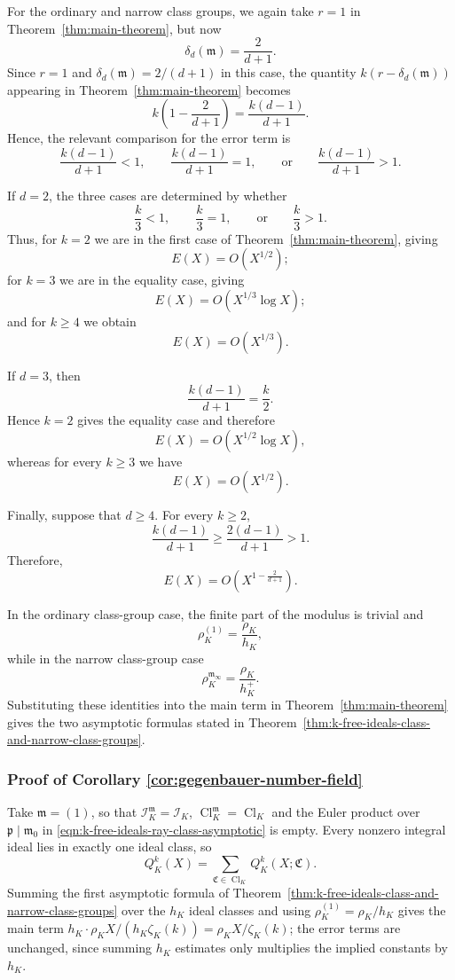 \documentclass[11pt, reqno]{amsart}
\numberwithin{equation}{section}
\newcommand{\Cl}{\operatorname{Cl}}
\theoremstyle{definition}
\begin{document}
For the ordinary and narrow class groups, we again take $r=1$ in
Theorem~\ref{thm:main-theorem}, but now
\[
\delta_d(\mathfrak{m})=\frac{2}{d+1}.
\]
Since $r=1$ and $\delta_d(\mathfrak{m})=2/(d+1)$ in this case, the quantity
$k(r-\delta_d(\mathfrak{m}))$ appearing in Theorem~\ref{thm:main-theorem}
becomes
\[
k\left(1-\frac{2}{d+1}\right)
=
\frac{k(d-1)}{d+1}.
\]
Hence, the relevant comparison for the error term is
\[
\frac{k(d-1)}{d+1}<1,\qquad
\frac{k(d-1)}{d+1}=1,\qquad\text{or}\qquad
\frac{k(d-1)}{d+1}>1.
\]

If $d=2$, the three cases are determined by whether
\[
\frac{k}{3}<1,\qquad
\frac{k}{3}=1,\qquad\text{or}\qquad
\frac{k}{3}>1.
\]
Thus, for $k=2$ we are in the first case of
Theorem~\ref{thm:main-theorem}, giving
\[
E(X)=O(X^{1/2});
\]
for $k=3$ we are in the equality case, giving
\[
E(X)=O(X^{1/3}\log X);
\]
and for $k\geq4$ we obtain
\[
E(X)=O(X^{1/3}).
\]

If $d=3$, then
\[
\frac{k(d-1)}{d+1}=\frac{k}{2}.
\]
Hence $k=2$ gives the equality case and therefore
\[
E(X)=O(X^{1/2}\log X),
\]
whereas for every $k\geq3$ we have
\[
E(X)=O(X^{1/2}).
\]

Finally, suppose that $d\geq4$. For every $k\geq2$,
\[
\frac{k(d-1)}{d+1}
\geq
\frac{2(d-1)}{d+1}
>1.
\]
Therefore,
\[
E(X)
=
O\left(X^{1-\frac{2}{d+1}}\right).
\]

In the ordinary class-group case, the finite part of the modulus is
trivial and
\[
\rho_K^{(1)}=\frac{\rho_K}{h_K},
\]
while in the narrow class-group case
\[
\rho_K^{\mathfrak{m}_{\infty}}
=
\frac{\rho_K}{h_K^+}.
\]
Substituting these identities into the main term in
Theorem~\ref{thm:main-theorem} gives the two asymptotic formulas stated
in Theorem~\ref{thm:k-free-ideals-class-and-narrow-class-groups}.

\subsubsection{Proof of Corollary \ref{cor:gegenbauer-number-field}}


Take $\mathfrak{m}=(1)$, so that
$\mathcal{I}_K^{\mathfrak{m}}=\mathcal{I}_K$,
$\Cl_K^{\mathfrak{m}}=\Cl_K$ and the Euler product over
$\mathfrak{p}\mid\mathfrak{m}_0$ in
\eqref{eqn:k-free-ideals-ray-class-asymptotic} is empty. Every nonzero integral
ideal lies in exactly one ideal class, so
\[
Q_K^k(X)=\sum_{\mathfrak{C}\in\Cl_K}Q_K^k(X;\mathfrak{C}).
\]
Summing the first asymptotic formula of
Theorem~\ref{thm:k-free-ideals-class-and-narrow-class-groups} over the $h_K$
ideal classes and using $\rho_K^{(1)}=\rho_K/h_K$ gives the main term
$h_K\cdot\rho_K X/(h_K\zeta_K(k))=\rho_K X/\zeta_K(k)$; the error terms are
unchanged, since summing $h_K$ estimates only multiplies the implied constants
by $h_K$.






















\end{document}
